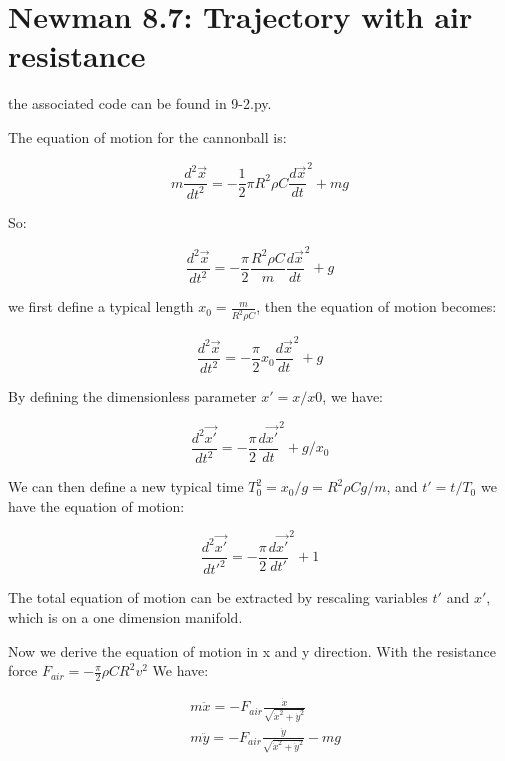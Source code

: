 \documentclass[letterpaper,12pt]{article}
\begin{document}
\section{Newman 8.7: Trajectory with air resistance}

the associated code can be found in 9-2.py.

The equation of motion for the cannonball is:

\begin{equation}
    m\frac{d^2\vec{x}}{dt^2} = -\frac{1}{2} \pi R^2\rho C \frac{d\vec{x}}{dt}^2 + mg
\end{equation}

So:

\begin{equation}
    \frac{d^2\vec{x}}{dt^2} = -\frac{\pi}{2} \frac{R^2\rho C}{m} \frac{d\vec{x}}{dt}^2 + g
\end{equation}

we first define a typical length $x_0 = \frac{m}{R^2\rho C}$, then the equation of motion becomes:

\begin{equation}
    \frac{d^2\vec{x}}{dt^2} = -\frac{\pi}{2} x_0 \frac{d\vec{x}}{dt}^2 + g
\end{equation}

By defining the dimensionless parameter $x' = x/x0$, we have:

\begin{equation}
    \frac{d^2\vec{x'}}{dt^2} = -\frac{\pi}{2} \frac{d\vec{x'}}{dt}^2 + g/x_0
\end{equation}

We can then define a new typical time $T_0^2 = x_0/g = R^2 \rho C g/m$, and $t' = t/T_0$ we have the equation of motion:

\begin{equation}
    \frac{d^2\vec{x'}}{dt'^2} = -\frac{\pi}{2} \frac{d\vec{x'}}{dt'}^2 + 1
\end{equation}

The total equation of motion can be extracted by rescaling variables $t'$ and $x'$, which is on a one dimension manifold.

Now we derive the equation of motion in x and y direction. With the resistance force $F_{air} = -\frac{\pi}{2} \rho C R^2 v^2$ We have:

\begin{align}
    & m\ddot{x} = -F_{air} \frac{\dot{x}}{\sqrt{\dot{x}^2 + \dot{y}^2}}\\
    & m\ddot{y} = -F_{air} \frac{\dot{y}}{\sqrt{\dot{x}^2 + \dot{y}^2}} - mg
\end{align}
\end{document}
